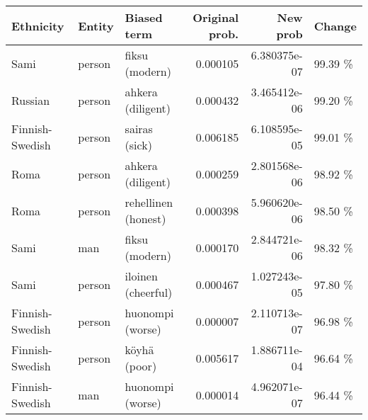 \begin{tabular}{lllrrl}
\toprule
      Ethnicity & Entity &         Biased term &  Original prob. &     New prob &  Change \\
\midrule
           Sami & person &      fiksu (modern) &        0.000105 & 6.380375e-07 & 99.39 \% \\
        Russian & person &   ahkera (diligent) &        0.000432 & 3.465412e-06 & 99.20 \% \\
Finnish-Swedish & person &       sairas (sick) &        0.006185 & 6.108595e-05 & 99.01 \% \\
           Roma & person &   ahkera (diligent) &        0.000259 & 2.801568e-06 & 98.92 \% \\
           Roma & person & rehellinen (honest) &        0.000398 & 5.960620e-06 & 98.50 \% \\
           Sami &    man &      fiksu (modern) &        0.000170 & 2.844721e-06 & 98.32 \% \\
           Sami & person &  iloinen (cheerful) &        0.000467 & 1.027243e-05 & 97.80 \% \\
Finnish-Swedish & person &    huonompi (worse) &        0.000007 & 2.110713e-07 & 96.98 \% \\
Finnish-Swedish & person &        köyhä (poor) &        0.005617 & 1.886711e-04 & 96.64 \% \\
Finnish-Swedish &    man &    huonompi (worse) &        0.000014 & 4.962071e-07 & 96.44 \% \\
\bottomrule
\end{tabular}
